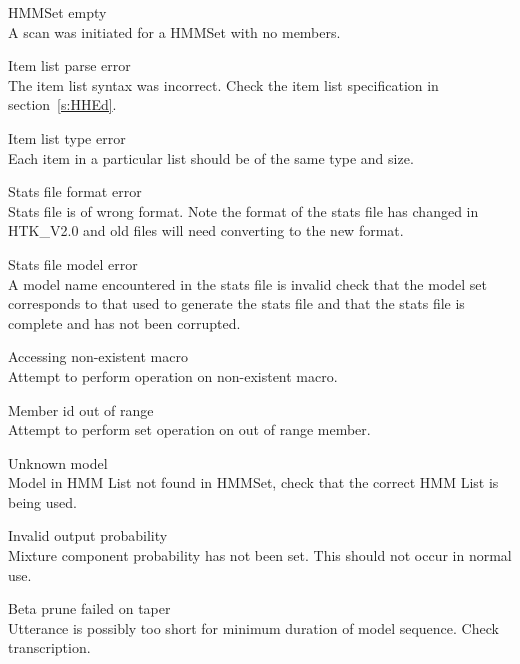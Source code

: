\begin{itemize}
\begin{itemize}
\end{itemize}


\begin{itemize}
    HMMSet empty\\
        A scan was initiated for a HMMSet with no members.

    Item list parse error\\
        The item list syntax was incorrect.  Check the item list specification
        in section~\ref{s:HHEd}.

    Item list type error\\
        Each item in a particular list should be of the same type and size.

    Stats file format error\\
        Stats file is of wrong format.  Note the format of the stats file has 
        changed in HTK\_V2.0 and old files will need converting to the new
        format.

    Stats file model error\\
        A model name encountered in the stats file is invalid check that the
        model set corresponds to that used to generate the stats file and that
        the stats file is complete and has not been corrupted.

    Accessing non-existent macro\\
        Attempt to perform operation on non-existent macro.

    Member id out of range\\
        Attempt to perform set operation on out of range member.

\end{itemize}


\begin{itemize}

    Unknown model\\
        Model in HMM List not found in HMMSet, check that the
        correct HMM List is being used.

    Invalid output probability\\
        Mixture component probability has not been set.  This should
        not occur in normal use.

    Beta prune failed on taper\\
        Utterance is possibly too short for minimum duration
        of model sequence. Check transcription.


\end{itemize}
\end{itemize}
